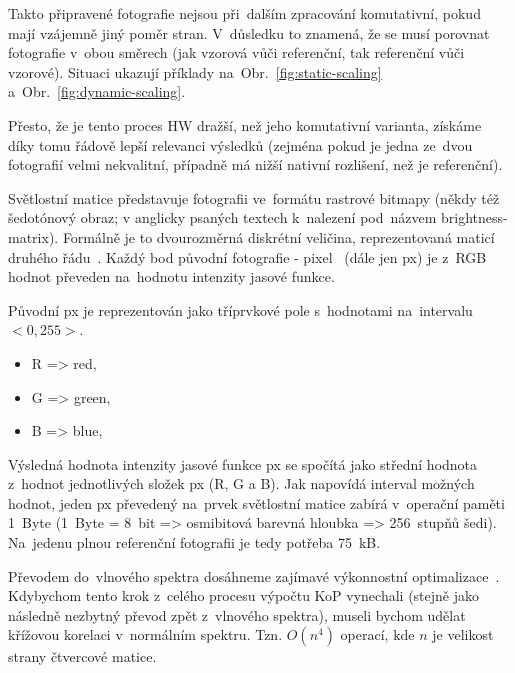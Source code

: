 Takto připravené fotografie nejsou při~dalším zpracování komutativní, pokud mají vzájemně jiný poměr stran. V~důsledku to znamená, že se musí porovnat fotografie v~obou směrech (jak vzorová vůči referenční, tak referenční vůči vzorové). Situaci ukazují příklady na~Obr.~\ref{fig:static-scaling} a~Obr.~\ref{fig:dynamic-scaling}.



Přesto, že je tento proces HW dražší, než jeho komutativní varianta, získáme díky tomu řádově lepší relevanci výsledků (zejména pokud je jedna ze~dvou fotografií velmi nekvalitní, případně má nižší nativní rozlišení, než je referenční).

Světlostní matice představuje fotografii ve~formátu rastrové bitmapy (někdy též šedotónový obraz; v anglicky psaných textech k~nalezení pod~názvem brightness-matrix). Formálně je to dvourozměrná diskrétní veličina, reprezentovaná maticí druhého řádu~\cite{brightness-matrix}. Každý bod původní fotografie - pixel~\cite{pixel} (dále jen px) je z~RGB~\cite{rgb} hodnot převeden na~hodnotu intenzity jasové funkce.

Původní px je reprezentován jako tříprvkové pole s~hodnotami na~intervalu $ <0,255> $.
\begin{itemize}
	\setlength{\parskip}{0pt}
	\setlength{\itemsep}{0pt}
	\item R => red,
	\item G => green,
	\item B => blue,
\end{itemize}

Výsledná hodnota intenzity jasové funkce px se spočítá jako střední hodnota z~hodnot jednotlivých složek px (R, G a B). Jak napovídá interval možných hodnot, jeden px převedený na~prvek světlostní matice zabírá v~operační paměti 1~Byte (1~Byte = 8~bit => osmibitová barevná hloubka => 256~stupňů šedi). Na~jedenu plnou referenční fotografii je tedy potřeba 75~kB.

Převodem do~vlnového spektra dosáhneme zajímavé výkonnostní optimalizace~\cite{FFT}. Kdybychom tento krok z~celého procesu výpočtu KoP vynechali (stejně jako následně nezbytný převod zpět z~vlnového spektra), museli bychom udělat křížovou korelaci v~normálním spektru. Tzn. $ O(n^4) $ operací, kde $ n $ je velikost strany čtvercové matice.

